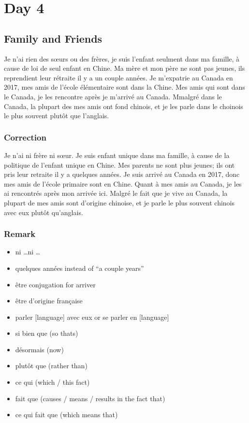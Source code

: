 \documentclass{book}
\begin{document}
\chapter{Day 4}
    \section{Family and Friends}
        Je n'ai rien des sœurs ou des frères, je suis l'enfant seulment dans ma famille, à cause de loi de seul enfant en Chine.
        Ma mère et mon père ne sont pas jeunes, ils reprendient leur rétraite il y a un couple années.
        Je m'expatrie au Canada en 2017, mes amis de l'école élémentaire sont dans la Chine. 
        Mes amis qui sont dans le Canada, je les rencontre après je m'arrivé au Canada.
        Mmalgré dans le Canada, la plupart des mes amis ont fond chinois, et je les parle dans le choinois le plus souvent plutôt que l'anglais.

    \subsection{Correction}
        Je n'ai ni frère ni sœur. Je suis enfant unique dans ma famille, à cause de la politique de l'enfant unique en Chine.
        Mes parents ne sont plus jeunes; ils ont pris leur retraite il y a quelques années.
        Je suis arrivé au Canada en 2017, donc mes amis de l'école primaire sont en Chine. 
        Quant à mes amis au Canada, je les ai rencontrés après mon arrivée ici. 
        Malgré le fait que je vive au Canada, la plupart de mes amis sont d'origine chinoise,
        et je parle le plus souvent chinois avec eux plutôt qu'anglais.

    \subsection{Remark}
        \begin{itemize}
            \item ni \dots ni \dots
            \item quelques années instead of ``a couple years''
            \item être conjugation for arriver
            \item être d'origine française
            \item parler [language] avec eux or se parler en [language]
            \item si bien que (so thats)
            \item désormais (now)
            \item plutôt que (rather than)
            \item ce qui (which / this fact)
            \item fait que (causes / means / results in the fact that)
            \item ce qui fait que (which means that)
        \end{itemize}
\end{document}
